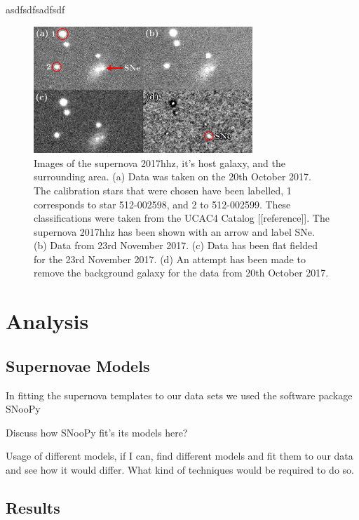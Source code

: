 \documentclass[twocolumn]{revtex4}
\begin{document}
asdfsdfsadfsdf

\begin{figure}[!h]
\begin{center}
\includegraphics[width=8.25cm]{images/collage_rectangle_small}
\caption[]{Images of the supernova 2017hhz, it's host galaxy, and the surrounding area. (a) Data was taken on the 20th October 2017. The calibration stars that were chosen have been labelled, 1 corresponds to star 512-002598, and 2 to 512-002599. These classifications were taken from the UCAC4 Catalog [[reference]]. The supernova 2017hhz has been shown with an arrow and label SNe. (b) Data from 23rd November 2017. (c) Data has been flat fielded for the 23rd November 2017. (d) An attempt has been made to remove the background galaxy for the data from 20th October 2017.}
\label{2017hhz_collage}
\end{center}
\end{figure}

\vspace{-3ex}
\section{Analysis}
\label{analysis}
\vspace{-2ex}
\subsection{Supernovae Models}
\vspace{-2ex}
In fitting the supernova templates to our data sets we used the software package SNooPy

Discuss how SNooPy fit's its models here? \cite{car_snoopy}

Usage of different models, if I can, find different models and fit them to our data and see how it would differ. What kind of techniques would be required to do so. 


\vspace{-3ex}
\subsection{Results}
\vspace{-2ex}
\end{document}

